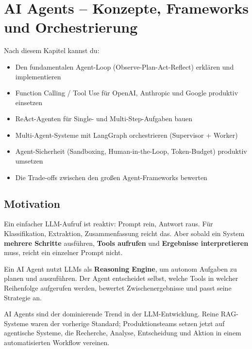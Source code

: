 \chapter{AI Agents -- Konzepte, Frameworks und Orchestrierung}
\label{chap:ai_agents}

\begin{lernziele}
Nach diesem Kapitel kannst du:
\begin{itemize}
    \item Den fundamentalen Agent-Loop (Observe-Plan-Act-Reflect) erklären und implementieren
    \item Function Calling / Tool Use für OpenAI, Anthropic und Google produktiv einsetzen
    \item ReAct-Agenten für Single- und Multi-Step-Aufgaben bauen
    \item Multi-Agent-Systeme mit LangGraph orchestrieren (Supervisor + Worker)
    \item Agent-Sicherheit (Sandboxing, Human-in-the-Loop, Token-Budget) produktiv umsetzen
    \item Die Trade-offs zwischen den großen Agent-Frameworks bewerten
\end{itemize}
\end{lernziele}

\section{Motivation}

Ein einfacher LLM-Aufruf ist reaktiv: Prompt rein, Antwort raus. Für Klassifikation, Extraktion, Zusammenfassung reicht das. Aber sobald ein System \textbf{mehrere Schritte} ausführen, \textbf{Tools aufrufen} und \textbf{Ergebnisse interpretieren} muss, reicht ein einzelner Prompt nicht.

Ein AI Agent nutzt LLMs als \textbf{Reasoning Engine}, um autonom Aufgaben zu planen und auszuführen. Der Agent entscheidet selbst, welche Tools in welcher Reihenfolge aufgerufen werden, bewertet Zwischenergebnisse und passt seine Strategie an.

AI Agents sind der dominierende Trend in der LLM-Entwicklung. Reine RAG-Systeme waren der vorherige Standard; Produktionsteams setzen jetzt auf agentische Systeme, die Recherche, Analyse, Entscheidung und Aktion in einem automatisierten Workflow vereinen.


